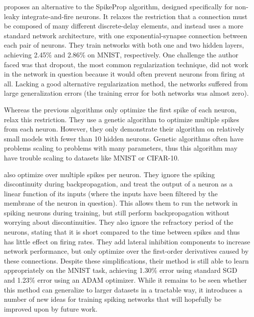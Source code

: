 \textcite{Mostafa2016} proposes an alternative to the SpikeProp algorithm,
designed specifically for non-leaky integrate-and-fire neurons.
It relaxes the restriction that a connection must be composed of
many different discrete-delay elements,
and instead uses a more standard network architecture,
with one exponential-synapse connection between each pair of neurons.
They train networks with both one and two hidden layers,
achieving 2.45\% and 2.86\% on MNIST, respectively.
One challenge the author faced was that dropout,
the most common regularization technique,
did not work in the network in question
because it would often prevent neurons from firing at all.
Lacking a good alternative regularization method,
the networks suffered from large generalization errors
(the training error for both networks was almost zero).

Whereas the previous algorithms only optimize the first spike of each neuron,
\textcite{Stromatias2014} relax this restriction.
They use a genetic algorithm to optimize multiple spikes from each neuron.
However, they only demonstrate their algorithm
on relatively small models with fewer than 10 hidden neurons.
Genetic algorithms often have problems scaling
to problems with many parameters,
thus this algorithm may have trouble scaling to datasets like MNIST or CIFAR-10.




\textcite{Lee2016} also optimize over multiple spikes per neuron.
They ignore the spiking discontinuity during backpropagation,
and treat the output of a neuron as a linear function of its inputs
(where the inputs have been filtered by the membrane of the neuron in question).
This allows them to run the network in spiking neurons during training,
but still perform backpropagation without worrying about discontinuities.
They also ignore the refractory period of the neurons,
stating that it is short compared to the time between spikes
and thus has little effect on firing rates.
They add lateral inhibition components to increase network performance,
but only optimize over the first-order derivatives caused by these connections.
Despite these simplifications,
their method is still able to learn appropriately on the MNIST task,
achieving 1.30\% error using standard SGD
and 1.23\% error using an ADAM optimizer.
While it remains to be seen whether this method
can generalize to larger datasets in a tractable way,
it introduces a number of new ideas for training spiking networks
that will hopefully be improved upon by future work.

